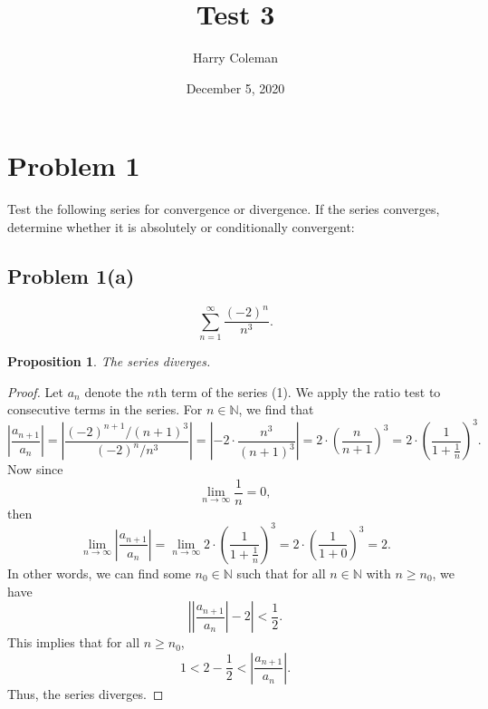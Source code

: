 \documentclass[12pt]{article}
\newtheorem{proposition}{Proposition}
\newenvironment{problem}
    {\begin{lrbox}{\mybox}\begin{minipage}{0.98\textwidth}}
    {\end{minipage}\end{lrbox}\framebox[\textwidth]{\usebox{\mybox}}}
\newcommand{\N}{\mathbb{N}} %
\newcommand{\<}{\left\langle} %
\renewcommand{\>}{\right\rangle} %
\begin{document}
 
\title{Test 3\\
}
\author{Harry Coleman}
\date{December 5, 2020}
\maketitle

\section*{Problem 1}
\begin{problem}
    Test the following series for convergence or divergence. If the series converges, determine whether it is absolutely or conditionally convergent:
\end{problem}

\subsection*{Problem 1(a)}
\begin{problem}
    \begin{equation}
        \sum_{n=1}^\infty \frac{(-2)^n}{n^3}.
    \end{equation}
\end{problem}

\begin{proposition}
    The series diverges.
\end{proposition}

\begin{proof}
    Let $a_n$ denote the $n$th term of the series (1). We apply the ratio test to consecutive terms in the series. For $n \in \N$, we find that
    \[
        \left| \frac{a_{n+1}}{a_n} \right| = \left| \frac{(-2)^{n+1}/(n + 1)^3}{(-2)^n/n^3} \right| = \left| -2 \cdot \frac{n^3}{(n + 1)^3} \right| = 2 \cdot \left( \frac{n}{n+1} \right)^3 = 2 \cdot \left( \frac{1}{1 + \frac1n} \right)^3.
    \]
    Now since
    \[
        \lim_{n \to \infty} \frac1n = 0,
    \]
    then
    \[
        \lim_{n \to \infty} \left| \frac{a_{n+1}}{a_n} \right| = \lim_{n \to \infty} 2 \cdot \left( \frac{1}{1 + \frac1n} \right)^3 = 2 \cdot \left( \frac{1}{1 + 0} \right)^3 = 2.
    \]
    In other words, we can find some $n_0 \in \N$ such that for all $n \in \N$ with $n \geq n_0$, we have
    \[
        \left| \left| \frac{a_{n+1}}{a_n} \right| - 2 \right| < \frac12.
    \]
    This implies that for all $n \geq n_0$,
    \[
        1 < 2 - \frac12 < \left| \frac{a_{n+1}}{a_n} \right|.
    \]
    Thus, the series diverges.
    
\end{proof}
\end{document}

